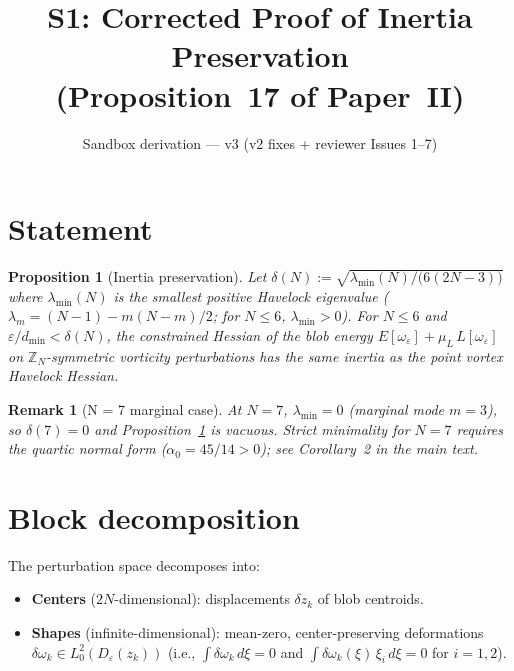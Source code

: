 \documentclass[11pt]{article}
\title{S1: Corrected Proof of Inertia Preservation\\(Proposition~17 of Paper~II)}
\author{Sandbox derivation — v3 (v2 fixes + reviewer Issues 1--7)}
\date{}
\newtheorem{proposition}{Proposition}
\newtheorem{remark}{Remark}
\begin{document}
\maketitle

\section{Statement}

\begin{proposition}[Inertia preservation]
\label{prop:inertia}
Let $\delta(N) := \sqrt{\lambda_{\min}(N)/\bigl(6(2N{-}3)\bigr)}$
where $\lambda_{\min}(N)$ is the smallest positive Havelock eigenvalue
($\lambda_m = (N{-}1) - m(N{-}m)/2$; for $N \le 6$, $\lambda_{\min} > 0$).
For $N \le 6$ and $\varepsilon/d_{\min} < \delta(N)$, the constrained
Hessian of the blob energy $E[\omega_\varepsilon] + \mu_L\,L[\omega_\varepsilon]$
on $\mathbb{Z}_N$-symmetric vorticity perturbations has the same inertia
as the point vortex Havelock Hessian.
\end{proposition}

\begin{remark}[N = 7 marginal case]
At $N = 7$, $\lambda_{\min} = 0$ (marginal mode $m = 3$), so
$\delta(7) = 0$ and Proposition~\ref{prop:inertia} is vacuous.
Strict minimality for $N = 7$ requires the quartic normal form
($\alpha_0 = 45/14 > 0$); see Corollary~2 in the main text.
\end{remark}

\section{Block decomposition}

The perturbation space decomposes into:
\begin{itemize}
  \item \textbf{Centers} ($2N$-dimensional): displacements $\delta z_k$ of
    blob centroids.
  \item \textbf{Shapes} (infinite-dimensional): mean-zero, center-preserving
    deformations $\delta\omega_k \in L^2_0(D_\varepsilon(z_k))$
    (i.e., $\int \delta\omega_k\,d\xi = 0$ and
    $\int \delta\omega_k(\xi)\,\xi_i\,d\xi = 0$ for $i = 1,2$).
\end{itemize}
\end{document}
